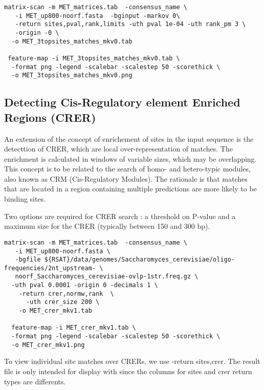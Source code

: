 {\color{Blue} \begin{footnotesize} 
\begin{verbatim}
matrix-scan -m MET_matrices.tab  -consensus_name \
   -i MET_up800-noorf.fasta  -bginput -markov 0\
   -return sites,pval,rank,limits -uth pval 1e-04 -uth rank_pm 3 \
   -origin -0 \
  -o MET_3topsites_matches_mkv0.tab

 feature-map -i MET_3topsites_matches_mkv0.tab \
  -format png -legend -scalebar -scalestep 50 -scorethick \
  -o MET_3topsites_matches_mkv0.png    

\end{verbatim} \end{footnotesize}
}

\subsection{Detecting Cis-Regulatory element Enriched Regions (CRER)}
An extension of the concept of enrichement of sites in the input sequence is the detecttion of CRER, which are local over-representation of matches. The enrichment is calculated in windows of variable sizes, which may be overlapping. This concept is to be related to the search of homo- and hetero-typic modules, also known as CRM (Cis-Regulatory Modules). The rationale is that matches that are located in a region containing multiple predictions are more likely to be binding sites. 

Two options are required for CRER search : a threshold on P-value and a maximum size for the CRER (typically between 150 and 300 bp).

{\color{Blue} \begin{footnotesize} 
\begin{verbatim}
matrix-scan -m MET_matrices.tab  -consensus_name \
   -i MET_up800-noorf.fasta \
   -bgfile ${RSAT}/data/genomes/Saccharomyces_cerevisiae/oligo-frequencies/2nt_upstream- \
   noorf_Saccharomyces_cerevisiae-ovlp-1str.freq.gz \
  -uth pval 0.0001 -origin 0 -decimals 1 \
    -return crer,normw,rank  \
      -uth crer_size 200 \
    -o MET_crer_mkv1.tab
   
  feature-map -i MET_crer_mkv1.tab \
  -format png -legend -scalebar -scalestep 50 -scorethick \
  -o MET_crer_mkv1.png    

\end{verbatim} \end{footnotesize}
}

To view individual site matches over CRERs, we use -return sites,crer. The result file is only intended for display with  since the columns for sites and crer return types are differents.


